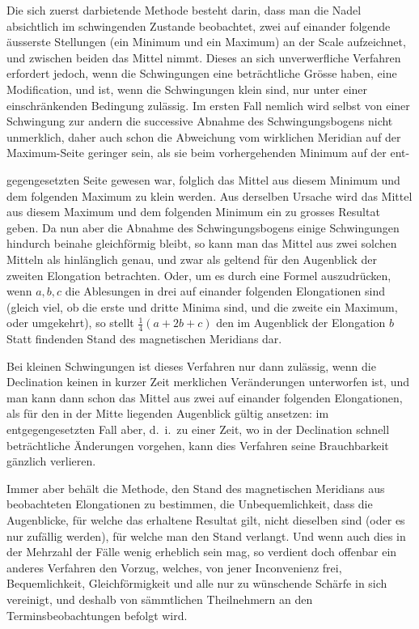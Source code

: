 Die sich zuerst darbietende Methode besteht darin, dass man die Nadel absichtlich im schwingenden Zustande beobachtet, zwei auf einander folgende äusserste Stellungen (ein Minimum und ein Maximum) an der Scale aufzeichnet, und zwischen beiden das Mittel nimmt. Dieses an sich unverwerfliche Verfahren erfordert jedoch, wenn die Schwingungen eine beträchtliche Grösse haben, eine Modification, und ist, wenn die Schwingungen klein sind, nur unter einer einschränkenden Bedingung zulässig. Im ersten Fall nemlich wird selbst von einer Schwingung zur andern die successive Abnahme des Schwingungsbogens nicht unmerklich, daher auch schon die Abweichung vom wirklichen Meridian auf der Maximum-Seite geringer sein, als sie beim vorhergehenden Minimum auf der ent-
\par\clearpage
{}
\noindent gegengesetzten Seite gewesen war, folglich das Mittel aus diesem Minimum und dem folgenden Maximum zu klein werden. Aus derselben Ursache wird das Mittel aus diesem Maximum und dem folgenden Minimum ein zu grosses Resultat geben. Da nun aber die Abnahme des Schwingungsbogens einige Schwingungen hindurch beinahe gleichförmig bleibt, so kann man das Mittel aus zwei solchen Mitteln als hinlänglich genau, und zwar als geltend für den Augenblick der zweiten Elongation betrachten. Oder, um es durch eine Formel auszudrücken, wenn $a,b,c$ die Ablesungen in drei auf einander folgenden Elongationen sind (gleich viel, ob die erste und dritte Minima sind, und die zweite ein Maximum, oder umgekehrt), so stellt $\tfrac14(a+2b+c)$ den im Augenblick der Elongation $b$ Statt findenden Stand des magnetischen Meridians dar.

Bei kleinen Schwingungen ist dieses Verfahren nur dann zulässig, wenn die Declination keinen in kurzer Zeit merklichen Veränderungen unterworfen ist, und man kann dann schon das Mittel aus zwei auf einander folgenden Elongationen, als für den in der Mitte liegenden Augenblick gültig ansetzen: im entgegengesetzten Fall aber, d.\ i.\ zu einer Zeit, wo in der Declination schnell beträchtliche Änderungen vorgehen, kann dies Verfahren seine Brauchbarkeit gänzlich verlieren.

Immer aber behält die Methode, den Stand des magnetischen Meridians aus beobachteten Elongationen zu bestimmen, die Unbequemlichkeit, dass die Augenblicke, für welche das erhaltene Resultat gilt, nicht dieselben sind (oder es nur zufällig werden), für welche man den Stand verlangt. Und wenn auch dies in der Mehrzahl der Fälle wenig erheblich sein mag, so verdient doch offenbar ein anderes Verfahren den Vorzug, welches, von jener Inconvenienz frei, Bequemlichkeit, Gleichförmigkeit und alle nur zu wünschende Schärfe in sich vereinigt, und deshalb von sämmtlichen Theilnehmern an den Terminsbeobachtungen befolgt wird.


